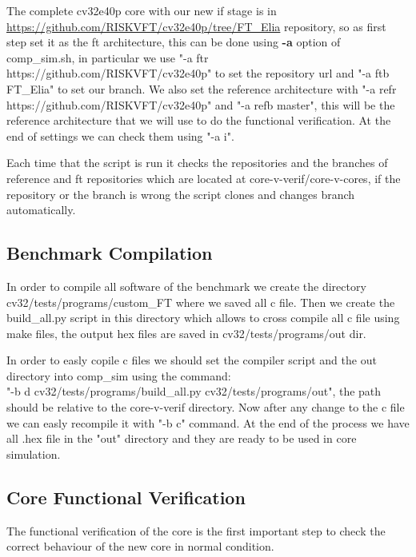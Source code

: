 {{{            The complete cv32e40p core with our new if stage is in \url{https://github.com/RISKVFT/cv32e40p/tree/FT_Elia} repository, so as first step set it as the ft architecture, this can be done using \textbf{-a} option of comp\_sim.sh, in particular we use \linebreak "-a ftr https://github.com/RISKVFT/cv32e40p" to set the repository url and \linebreak"-a ftb FT\_Elia" to set our branch. 
            We also set the reference architecture with \linebreak "-a refr https://github.com/RISKVFT/cv32e40p" and "-a refb master", this will be the reference architecture that we will use to do the functional verification.
            At the end of settings we can check them using "-a i".
            
            Each time that the script is run it checks the repositories and the branches of reference and ft repositories which are located at core-v-verif/core-v-cores, if the repository or the branch is wrong the script clones and changes branch automatically.
        }
        
        \subsection{Benchmark Compilation}{ 
            
            In order to compile all software of the benchmark we create the directory
            \linebreak cv32/tests/programs/custom\_FT where we saved all c file. Then we create the build\_all.py script in this directory which allows to cross compile all c file using make files, the output hex files are saved in \breakline cv32/tests/programs/out dir. 
            
            
            In order to easly copile c files we should set the compiler script and the out directory into comp\_sim using the command:\\
            "-b d cv32/tests/programs/build\_all.py cv32/tests/programs/out", the path should be relative to the core-v-verif directory. Now after any change to the c file we can easly recompile it with "-b c" command. At the end of the process we have all .hex file in the "out" directory and they are ready to be used in core simulation. 
        }%
        
        \subsection{Core Functional Verification}{
            The functional verification of the core is the first important step to check the correct behaviour of the new core in normal condition.
            
}}}
